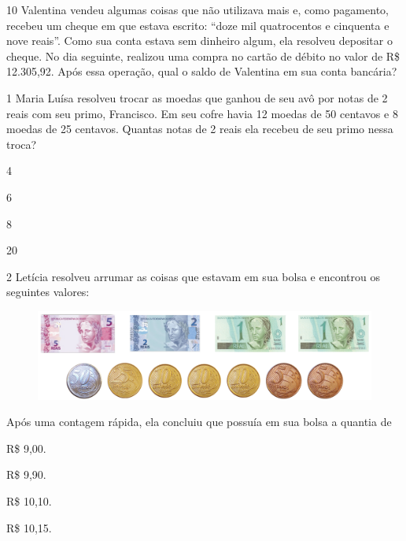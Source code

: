 \num{10} Valentina vendeu algumas coisas que não utilizava mais e, como
pagamento, recebeu um cheque em que estava escrito: “doze mil quatrocentos
e cinquenta e nove reais”. Como sua conta estava sem dinheiro algum, ela
resolveu depositar o cheque. No dia seguinte, realizou uma compra no cartão de débito no valor de R\$ 12.305,92. Após essa operação, qual o
saldo de Valentina em sua conta bancária?



\pagebreak
{}

\num{1} Maria Luísa resolveu trocar as moedas que ganhou de seu avô por
notas de 2 reais com seu primo, Francisco. Em seu cofre havia 12 moedas de 50 centavos e 8 moedas de 25 centavos. Quantas notas de 2
reais ela recebeu de seu primo nessa troca?

\begin{minipage}{.5\textwidth}
\begin{escolha}
\item
  4
\item
  6
\item
  8
\item
  20
\end{escolha}
\end{minipage}

\bigskip
\bigskip
\bigskip

\num{2} Letícia resolveu arrumar as coisas que estavam em sua bolsa e
encontrou os seguintes valores:

\begin{figure}[htpb!]
\includegraphics[width=\textwidth]{../ilustracoes/MAT5/SAEB_5ANO_MAT_figura56.png}
\end{figure}

Após uma contagem rápida, ela concluiu que possuía em sua bolsa a quantia de

\begin{minipage}{.5\textwidth}
\begin{escolha}
\item
  R\$ 9,00.
\item
  R\$ 9,90.
\item
  R\$ 10,10.
\item
  R\$ 10,15.
\end{escolha}
\end{minipage}

